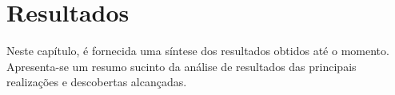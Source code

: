 \section{Resultados} \label{sec:result}

Neste capítulo, é fornecida uma síntese dos resultados obtidos até o momento. Apresenta-se um resumo sucinto da análise de resultados das principais realizações e descobertas alcançadas.








